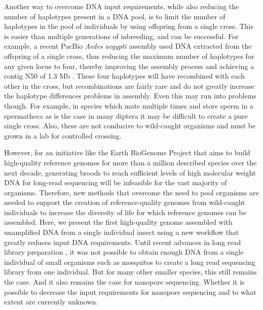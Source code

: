 \par{
Another way to overcome DNA input requirements, while also reducing the number of haplotypes present in a DNA pool, is to limit the number of haplotypes in the pool of individuals by using offspring from a single cross. This is easier than multiple generations of inbreeding, and can be successful. For example, a recent PacBio \textit{Aedes aegypti} assembly used DNA extracted from the offspring of a single cross, thus reducing the maximum number of haplotypes for any given locus to four, thereby improving the assembly process and achieving a contig N50 of 1.3 Mb \cite{Matthews2018-th}. These four haplotypes will have recombined with each other in the cross, but recombinations are fairly rare and do not greatly increase the haplotype differences problems in assembly. Even this may run into problems though. For example, in species which mate multiple times and store sperm in a spermatheca as is the case in many diptera\cite{spermatheca}\cite{polyandry} it may be difficult to create a pure single cross. Also, these are not conducive to wild-caught organisms and must be grown in a lab for controlled crossing.
} \\

\par{
However, for an initiative like the Earth BioGenome Project \cite{Lewin2018-lc} that aims to build high-quality reference genomes for more than a million described species over the next decade, generating broods to reach sufficient levels of high molecular weight DNA for long-read sequencing will be infeasible for the vast majority of organisms. Therefore, new methods that overcome the need to pool organisms are needed to support the creation of reference-quality genomes from wild-caught individuals to increase the diversity of life for which reference genomes can be assembled. Here, we present the first high-quality genome assembled with unamplified DNA from a single individual insect using a new workflow that greatly reduces input DNA requirements. Until recent advances in long read library preparation \cite{mosquito_assembly}, it was not possible to obtain
enough DNA from a single individual of small organisms such as mosquitos to create a long read sequencing library from one individual. 
But for many other smaller species, this still remains the case. And it also remains the case for nanopore sequencing. 
Whether it is possible to decrease the input requirements for nanopore sequencing and to what extent are currently unknown.  
} \\

